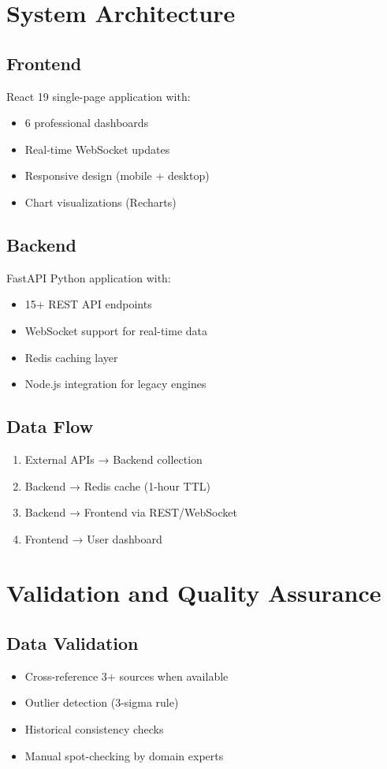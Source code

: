 \documentclass[11pt,a4paper]{article}
\begin{document}
\section{System Architecture}

\subsection{Frontend}
React 19 single-page application with:
\begin{itemize}
    \item 6 professional dashboards
    \item Real-time WebSocket updates
    \item Responsive design (mobile + desktop)
    \item Chart visualizations (Recharts)
\end{itemize}

\subsection{Backend}
FastAPI Python application with:
\begin{itemize}
    \item 15+ REST API endpoints
    \item WebSocket support for real-time data
    \item Redis caching layer
    \item Node.js integration for legacy engines
\end{itemize}

\subsection{Data Flow}
\begin{enumerate}
    \item External APIs → Backend collection
    \item Backend → Redis cache (1-hour TTL)
    \item Backend → Frontend via REST/WebSocket
    \item Frontend → User dashboard
\end{enumerate}

\section{Validation and Quality Assurance}

\subsection{Data Validation}
\begin{itemize}
    \item Cross-reference 3+ sources when available
    \item Outlier detection (3-sigma rule)
    \item Historical consistency checks
    \item Manual spot-checking by domain experts
\end{itemize}
\end{document}
